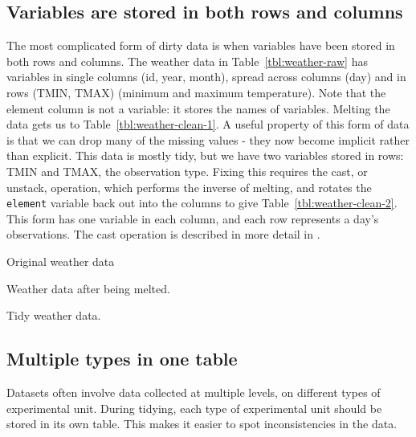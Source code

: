 \documentclass[oneside]{article}
\begin{document}
\subsection{Variables are stored in both rows and columns}

The most complicated form of dirty data is when variables have been stored in both rows and columns. The weather data in Table~\ref{tbl:weather-raw} has variables in single columns (id, year, month), spread across columns (day) and in rows (TMIN, TMAX) (minimum and maximum temperature). Note that the element column is not a variable: it stores the names of variables. Melting the data gets us to Table~\ref{tbl:weather-clean-1}. A useful property of this form of data is that we can drop many of the missing values - they now become implicit rather than explicit. This data is mostly tidy, but we have two variables stored in rows: TMIN and TMAX, the observation type. Fixing this requires the cast, or unstack, operation, which performs the inverse of melting, and rotates the {\tt element} variable back out into the columns to give Table~\ref{tbl:weather-clean-2}. This form has one variable in each column, and each row represents a day's observations. The cast operation is described in more detail in \citet{wickham:2007b}.

\begin{table}[htbp]
  \centering
  
  \caption{Original weather data}
  \label{tbl:weather-raw}
\end{table}

\begin{table}[htbp]
  \centering
  
  \caption{Weather data after being melted.}
  \label{tbl:weather-clean-1}
\end{table}

\begin{table}[htbp]
  \centering
  
  \caption{Tidy weather data.}
  \label{tbl:weather-clean-2}
\end{table}

\subsection{Multiple types in one table}

Datasets often involve data collected at multiple levels, on different types of experimental unit. During tidying, each type of experimental unit should be stored in its own table. This makes it easier to spot inconsistencies in the data.
\end{document}
